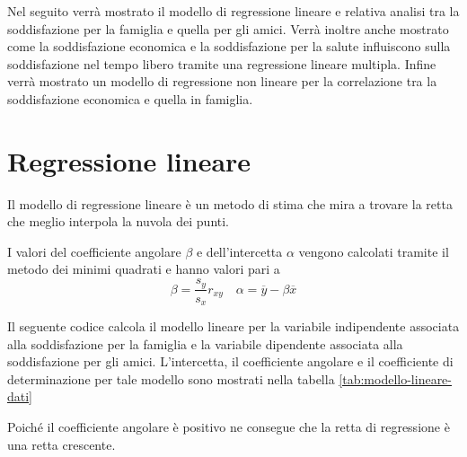 \documentclass[]{book}
\newenvironment{Shaded}{\begin{snugshade}}{\end{snugshade}}
\newcommand{\KeywordTok}[1]{\textcolor[rgb]{0.13,0.29,0.53}{\textbf{#1}}}
\newcommand{\DecValTok}[1]{\textcolor[rgb]{0.00,0.00,0.81}{#1}}
\newcommand{\StringTok}[1]{\textcolor[rgb]{0.31,0.60,0.02}{#1}}
\newcommand{\OperatorTok}[1]{\textcolor[rgb]{0.81,0.36,0.00}{\textbf{#1}}}
\newcommand{\NormalTok}[1]{#1}
\begin{document}
Nel seguito verrà mostrato il modello di regressione lineare e relativa
analisi tra la soddisfazione per la famiglia e quella per gli amici.
Verrà inoltre anche mostrato come la soddisfazione economica e la
soddisfazione per la salute influiscono sulla soddisfazione nel tempo
libero tramite una regressione lineare multipla. Infine verrà mostrato
un modello di regressione non lineare per la correlazione tra la
soddisfazione economica e quella in famiglia.

\section{Regressione lineare}\label{regressione-lineare}

Il modello di regressione lineare è un metodo di stima che mira a
trovare la retta che meglio interpola la nuvola dei punti.

I valori del coefficiente angolare \(\beta\) e dell'intercetta
\(\alpha\) vengono calcolati tramite il metodo dei minimi quadrati e
hanno valori pari a
\[\beta = \frac{s_y}{s_x} r_{xy} \quad  \alpha=\overline{y}-\beta\overline{x}\]

Il seguente codice calcola il modello lineare per la variabile
indipendente associata alla soddisfazione per la famiglia e la variabile
dipendente associata alla soddisfazione per gli amici. L'intercetta, il
coefficiente angolare e il coefficiente di determinazione per tale
modello sono mostrati nella tabella \ref{tab:modello-lineare-dati}

\begin{Shaded}
\end{Shaded}

Poiché il coefficiente angolare è positivo ne consegue che la retta di
regressione è una retta crescente.
\end{document}

